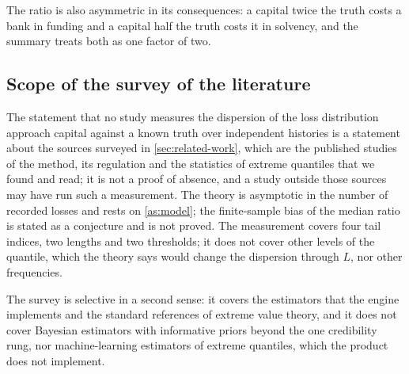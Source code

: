 The ratio is also asymmetric in its consequences: a capital twice the truth costs a bank in funding and a capital half the truth costs it in solvency, and the summary treats both as one factor of two.

\subsection{Scope of the survey of the literature}
\label{sec:lim-literature}

The statement that no study measures the dispersion of the loss distribution approach capital against a known truth over independent histories is a statement about the sources surveyed in \cref{sec:related-work}, which are the published studies of the method, its regulation and the statistics of extreme quantiles that we found and read; it is not a proof of absence, and a study outside those sources may have run such a measurement.
The theory is asymptotic in the number of recorded losses and rests on \cref{as:model}; the finite-sample bias of the median ratio is stated as a conjecture and is not proved. The measurement covers four tail indices, two lengths and two thresholds; it does not cover other levels of the quantile, which the theory says would change the dispersion through $L$, nor other frequencies.

The survey is selective in a second sense: it covers the estimators that the engine implements and the standard references of extreme value theory, and it does not cover Bayesian estimators with informative priors beyond the one credibility rung, nor machine-learning estimators of extreme quantiles, which the product does not implement.
